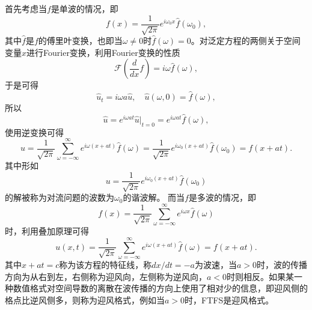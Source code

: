 \documentclass[a4paper,10pt]{ctexart}
\begin{document}
首先考虑当$ f $是单波的情况，即
\[
    f(x) = \frac{1}{\sqrt{2\pi} }e^{i \omega_0 x}\hat{f}(\omega_0),
\]
其中$ \hat{f} $是$ f $的傅里叶变换，也即当$ \omega\ne 0 $时$ \hat{f}(\omega) = 0 $。对泛定方程的两侧关于空间变量$ x $进行Fourier变换，利用Fourier变换的性质
\[
    \mathcal{F}(\frac{d}{dx}f) = i\omega \hat{f}(\omega),
\]
于是可得
\[
    \hat{u}_t = i\omega a\hat{u},\quad \hat{u}(\omega,0) = \hat{f}(\omega),
\]
所以
\[
    \hat{u} = e^{i \omega at} \hat{u}|_{t=0} = e^{i \omega at} \hat{f}(\omega),
\]
使用逆变换可得
\[
    u = \frac{1}{\sqrt{2\pi} }\sum_{\omega=-\infty}^{\infty} e^{i \omega (x+at)}\hat{f}(\omega) = \frac{1}{\sqrt{2\pi} }e^{i \omega_0 (x+at)}\hat{f}(\omega_0) = f(x+at).
\]
其中形如
\[
    u = \frac{1}{\sqrt{2\pi} }e^{i \omega_0 (x+at)}\hat{f}(\omega_0)
\]
的解被称为对流问题的波数为$ \omega_0 $的谐波解。
而当$ f $是多波的情况，即
\[
    f(x) = \frac{1}{\sqrt{2\pi} }\sum_{\omega=-\infty}^{\infty} e^{i \omega x}\hat{f}(\omega)
\]
时，利用叠加原理可得
\[
    u(x,t) = \frac{1}{\sqrt{2\pi} }\sum_{\omega=-\infty}^{\infty} e^{i \omega (x+at)}\hat{f}(\omega) =f(x+at).
\]
其中$ x+at = c $称为该方程的特征线，称$ dx / dt = -a $为波速，当$ a>0 $时，波的传播方向为从右到左，右侧称为迎风向，左侧称为逆风向，$ a<0 $时则相反。如果某一种数值格式对空间导数的离散在波传播的方向上使用了相对少的信息，即迎风侧的格点比逆风侧多，则称为迎风格式，例如当$ a>0 $时，FTFS是迎风格式。
\end{document}
